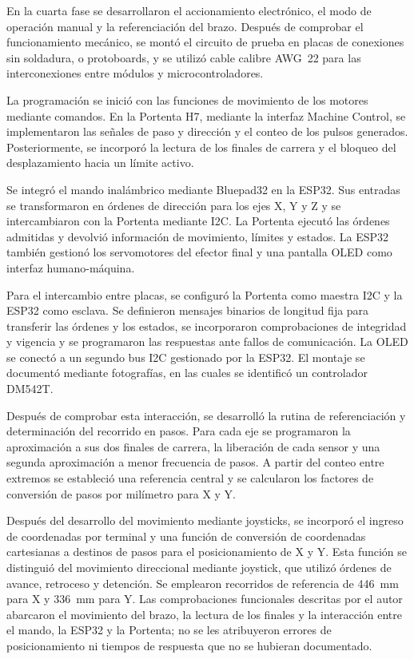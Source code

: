 
En la cuarta fase se desarrollaron el accionamiento electrónico, el modo de operación manual y la referenciación del brazo. Después de comprobar el funcionamiento mecánico, se montó el circuito de prueba en placas de conexiones sin soldadura, o protoboards, y se utilizó cable calibre AWG~22 para las interconexiones entre módulos y microcontroladores.

La programación se inició con las funciones de movimiento de los motores mediante comandos. En la Portenta H7, mediante la interfaz Machine Control, se implementaron las señales de paso y dirección y el conteo de los pulsos generados. Posteriormente, se incorporó la lectura de los finales de carrera y el bloqueo del desplazamiento hacia un límite activo.

Se integró el mando inalámbrico mediante Bluepad32 en la ESP32. Sus entradas se transformaron en órdenes de dirección para los ejes X, Y y Z y se intercambiaron con la Portenta mediante I2C. La Portenta ejecutó las órdenes admitidas y devolvió información de movimiento, límites y estados. La ESP32 también gestionó los servomotores del efector final y una pantalla OLED como interfaz humano-máquina.

Para el intercambio entre placas, se configuró la Portenta como maestra I2C y la ESP32 como esclava. Se definieron mensajes binarios de longitud fija para transferir las órdenes y los estados, se incorporaron comprobaciones de integridad y vigencia y se programaron las respuestas ante fallos de comunicación. La OLED se conectó a un segundo bus I2C gestionado por la ESP32. El montaje se documentó mediante fotografías, en las cuales se identificó un controlador DM542T.

Después de comprobar esta interacción, se desarrolló la rutina de referenciación y determinación del recorrido en pasos. Para cada eje se programaron la aproximación a sus dos finales de carrera, la liberación de cada sensor y una segunda aproximación a menor frecuencia de pasos. A partir del conteo entre extremos se estableció una referencia central y se calcularon los factores de conversión de pasos por milímetro para X y Y.

Después del desarrollo del movimiento mediante joysticks, se incorporó el ingreso de coordenadas por terminal y una función de conversión de coordenadas cartesianas a destinos de pasos para el posicionamiento de X y Y. Esta función se distinguió del movimiento direccional mediante joystick, que utilizó órdenes de avance, retroceso y detención. Se emplearon recorridos de referencia de 446~mm para X y 336~mm para Y. Las comprobaciones funcionales descritas por el autor abarcaron el movimiento del brazo, la lectura de los finales y la interacción entre el mando, la ESP32 y la Portenta; no se les atribuyeron errores de posicionamiento ni tiempos de respuesta que no se hubieran documentado.

